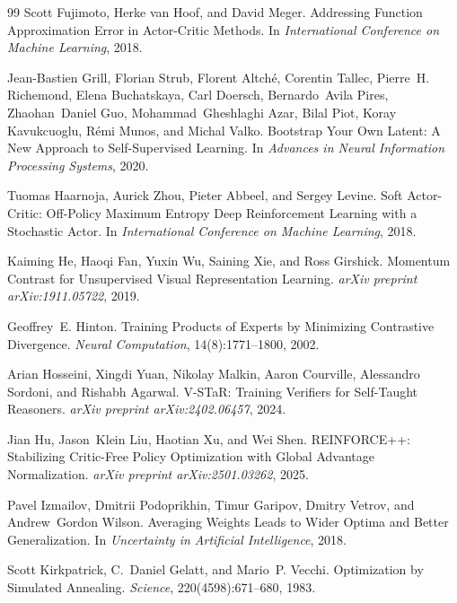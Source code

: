 \documentclass{article}
\begin{document}
\begin{thebibliography}{99}
Scott Fujimoto, Herke van Hoof, and David Meger.
\newblock Addressing Function Approximation Error in Actor-Critic Methods.
\newblock In \emph{International Conference on Machine Learning}, 2018.

Jean-Bastien Grill, Florian Strub, Florent Altch\'e, Corentin Tallec, Pierre~H. Richemond, Elena Buchatskaya, Carl Doersch, Bernardo~Avila Pires, Zhaohan~Daniel Guo, Mohammad~Gheshlaghi Azar, Bilal Piot, Koray Kavukcuoglu, R\'emi Munos, and Michal Valko.
\newblock Bootstrap Your Own Latent: A New Approach to Self-Supervised Learning.
\newblock In \emph{Advances in Neural Information Processing Systems}, 2020.

Tuomas Haarnoja, Aurick Zhou, Pieter Abbeel, and Sergey Levine.
\newblock Soft Actor-Critic: Off-Policy Maximum Entropy Deep Reinforcement Learning with a Stochastic Actor.
\newblock In \emph{International Conference on Machine Learning}, 2018.

Kaiming He, Haoqi Fan, Yuxin Wu, Saining Xie, and Ross Girshick.
\newblock Momentum Contrast for Unsupervised Visual Representation Learning.
\newblock \emph{arXiv preprint arXiv:1911.05722}, 2019.

Geoffrey~E. Hinton.
\newblock Training Products of Experts by Minimizing Contrastive Divergence.
\newblock \emph{Neural Computation}, 14(8):1771--1800, 2002.

Arian Hosseini, Xingdi Yuan, Nikolay Malkin, Aaron Courville, Alessandro Sordoni, and Rishabh Agarwal.
\newblock V-STaR: Training Verifiers for Self-Taught Reasoners.
\newblock \emph{arXiv preprint arXiv:2402.06457}, 2024.

Jian Hu, Jason~Klein Liu, Haotian Xu, and Wei Shen.
\newblock REINFORCE++: Stabilizing Critic-Free Policy Optimization with Global Advantage Normalization.
\newblock \emph{arXiv preprint arXiv:2501.03262}, 2025.

Pavel Izmailov, Dmitrii Podoprikhin, Timur Garipov, Dmitry Vetrov, and Andrew~Gordon Wilson.
\newblock Averaging Weights Leads to Wider Optima and Better Generalization.
\newblock In \emph{Uncertainty in Artificial Intelligence}, 2018.

Scott Kirkpatrick, C.~Daniel Gelatt, and Mario~P. Vecchi.
\newblock Optimization by Simulated Annealing.
\newblock \emph{Science}, 220(4598):671--680, 1983.


\end{thebibliography}
\end{document}
